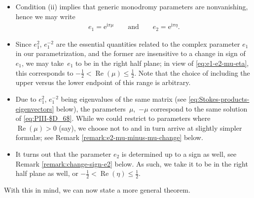 \documentclass[11pt]{article}
\numberwithin{equation}{section}
\numberwithin{equation}{section}
\newcommand{\ee}{\mathrm{e}}
\newcommand{\ii}{\mathrm{i}}
\newcommand{\re}{\operatorname{Re}}
\begin{document}
\begin{itemize}\itemsep=0pt
 \item Condition (ii) implies that generic monodromy parameters are nonvanishing, hence we may write
 \begin{gather}
 e_1=\ee^{\ii\pi\mu}\qquad \text{and}\qquad e_2=\ee^{\ii\pi\eta}. \label{eq:e1-e2-mu-eta}
 \end{gather}
 \item Since $e_1^2$, $e_1^{-2}$ are the essential quantities related to the complex parameter $e_1$ in our parametrization, and the former are insensitive to a change in sign of $e_1$, we may take~$e_1$ to be in the right half plane; in view of \eqref{eq:e1-e2-mu-eta}, this corresponds to $-\frac12 < \re(\mu) \leq \frac12$. Note that the choice of including the upper versus the lower endpoint of this range is arbitrary.
 \item Due to $e_1^2$, $e_1^{-2}$ being eigenvalues of the same matrix (see \eqref{eq:Stokes-products-eigenvectors} below), the parameters~$\mu$,~$-\mu$ correspond to the same solution of \eqref{eq:PIII-$D_6$}. While we could restrict to parameters where $\re(\mu) >0$ (say), we choose not to and in turn arrive at slightly simpler formul\ae; see Remark \ref{remark:e2-mu-minus-mu-change} below.
 \item It turns out that the parameter $e_2$ is determined up to a sign as well, see Remark \ref{remark:change-sign-e2} below. As such, we take it to be in the right half plane as well, or $-\frac12 < \re(\eta) \leq \frac12$.
\end{itemize}
With this in mind, we can now state a more general theorem.
\end{document}
